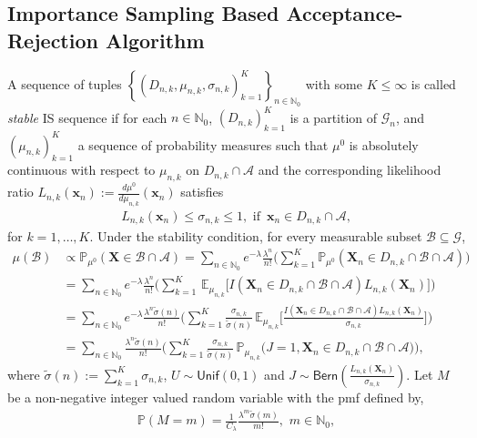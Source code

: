 \documentclass[11pt]{article}
\newcommand{\pp}{\mathbb{P}}
\newcommand{\ee}{\mathbb{E}}
\newcommand{\mbb}{\mathbb}
\newcommand{\lt}{\left}
\newcommand{\rt}{\right}
\newcommand{\wt}{\widetilde}
\newcommand{\bern}{\mathsf{Bern}}
\newcommand{\lfs}{\mathbf{x}}
\newcommand{\state}{\mathbf{X}}
\begin{document}
\subsection{Importance Sampling Based Acceptance-Rejection Algorithm}
\label{sec:AR_GSC}
A sequence of tuples ${\lt\{ \lt(D_{n,k}, \mu_{n,k}, \sigma_{n,k}\rt)_{k = 1}^K\rt\}_{n \in \mbb{N}_0}}$ with some $K  \leq \infty$ is called  {\em stable} IS sequence if for each ${n \in \mbb{N}_0}$,  ${\lt(D_{n,k} \rt)_{k = 1}^{K}}$ is a partition of $\mathscr{G}_n$, and
$(\mu_{n,k})_{k = 1}^{K}$  a sequence of probability measures  such that $\mu^0$  is absolutely continuous with respect to  $\mu_{n,k}$ on $D_{n,k} \cap \mathscr{A}$ and the corresponding likelihood ratio ${L_{n,k}(\lfs_n) := \frac{d\mu^0}{d\mu_{n,k}}(\lfs_n)}$ satisfies
 \begin{align*}
L_{n,k}(\lfs_n)  \leq \sigma_{n,k} \leq 1, \text{ if }\, \lfs_n \in D_{n,k} \cap \mathscr{A},
 \end{align*}
 for $k = 1, \dots, K$. Under the stability condition, for every measurable subset ${\mathscr{B} \subseteq  \mathscr{G}}$,
\begin{align}
 \mu(\mathscr{B}) &\propto \pp_{\mu^0}(\state \in \mathscr{B} \cap \mathscr{A}) = \sum_{n \in \mbb{N}_0} e^{-\lambda}\frac{\lambda^n}{n!} \Bigg(\sum_{k=1}^{K} \pp_{\mu^0}\lt(\state_n \in D_{n,k} \cap \mathscr{B} \cap \mathscr{A}\rt) \Bigg) \nonumber\\
        &= \sum_{n \in \mbb{N}_0} e^{-\lambda}\frac{\lambda^n }{n!} \Bigg(\sum_{k=1}^{K} \, \ee_{\mu_{n,k}}\big[ I\lt(\state_n \in D_{n,k} \cap \mathscr{B} \cap \mathscr{A}\rt)L_{n,k}(\state_n)\big] \Bigg) \nonumber\\
        &= \sum_{n \in \mbb{N}_0} e^{-\lambda}\frac{\lambda^n \wt \sigma(n)}{n!} \Bigg(\sum_{k=1}^{K} \frac{\sigma_{n,k}}{\wt \sigma(n)}\, \ee_{\mu_{n,k}}\Bigg[ \frac{I(\state_n \in D_{n,k} \cap \mathscr{B} \cap \mathscr{A})L_{n,k}(\state_n)}{\sigma_{n,k}}\Bigg] \Bigg)\nonumber \\
        &=  \sum_{n \in \mbb{N}_0} \frac{\lambda^n \wt \sigma(n)}{n!} \Bigg(\sum_{k=1}^{K} \frac{\sigma_{n,k}}{\wt \sigma(n)}\, \pp_{\mu_{n,k}}\big( J = 1, \state_n \in D_{n,k} \cap \mathscr{B} \cap \mathscr{A} \big) \Bigg),\label{eqn:mu_IS}
\end{align}
where ${\wt \sigma(n) := \sum_{k=1}^{K} \sigma_{n,k}}$, ${U \sim \mathsf{Unif}(0,1)}$ and $ J \sim \bern\left(\frac{L_{n,k}(\state_n)}{\sigma_{n,k}}\right)$.
Let $M$ be a non-negative integer valued random variable with the
pmf defined by,
\begin{align}
 \label{eqn:dist_M_gen_stab}
 \pp\lt(M = m\rt) = \frac{1}{C_{\lambda}}\frac{\lambda^m \wt \sigma(m)}{m!},\,\, m \in \mbb{N}_0,
\end{align}
\end{document}
